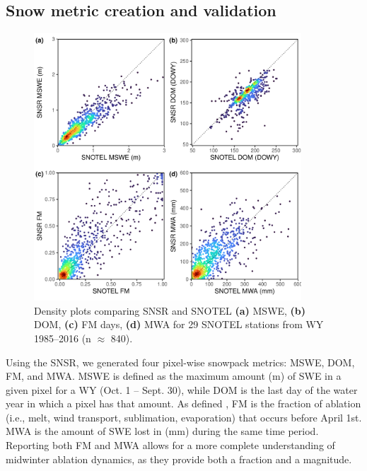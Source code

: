 
\hypertarget{ch2-methods-1}{\subsection{Snow metric creation and validation}\label{ch2-methods-1}}

\begin{figure}[t]
\centering
\includegraphics[width=10cm]{figures/ch2_figs/snsr_snotel_metric_compare_new_v1.pdf}
\caption{Density plots comparing SNSR and SNOTEL \textbf{(a)} MSWE, \textbf{(b)} DOM, \textbf{(c)} FM days, \textbf{(d)} MWA for 29 SNOTEL stations from WY 1985--2016 (n $\approx$ 840).}
\label{kuy_study_area}
\end{figure}

Using the SNSR, we generated four pixel-wise snowpack metrics: MSWE, DOM, FM, and MWA. MSWE is defined as the maximum amount (m) of SWE in a given pixel for a WY (Oct. 1 -- Sept. 30), while DOM is the last day of the water year in which a pixel has that amount. As defined \cite{musselmanWinterMeltTrends2021}, FM is the fraction of ablation (i.e., melt, wind transport, sublimation, evaporation) that occurs before April 1st. MWA is the amount of SWE lost in (mm) during the same time period. Reporting both FM and MWA allows for a more complete understanding of midwinter ablation dynamics, as they provide both a fraction and a magnitude.

